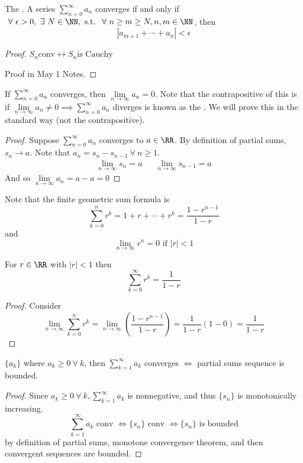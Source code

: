 \documentclass[12pt]{scrartcl}
\begin{document}
\begin{theorem}
  The . A series $\sum_{n=0}^\infty a_n$ converges 
  if and only if $\ \forall \ \epsilon > 0, \ \exists \ N \in \NN, \text{ s.t. } \ \forall \ n \geq m \geq N, n,m \in \NN$, then 
  \[|a_{m+1} + \cdots + a_n| < \epsilon\]
  \begin{proof}
    $S_n \text{conv} \leftrightarrow S_n \text{is Cauchy}$

    Proof in May 1 Notes.
  \end{proof}
\end{theorem}

\begin{theorem}
  If $\sum_{n = 0}^\infty a_n$ converges, then $\underset{n\to\infty}{\lim}a_n = 0$. Note that the contrapositive of this is 
  if $\underset{n\to\infty}{\lim}a_n \neq 0 \implies \sum_{n=0}^\infty a_n$ diverges is known as the .
  We will prove this in the standard way (not the contrapositive).

  \begin{proof}
    Suppose $\sum_{n=0}^\infty a_n$ converges to $a \in \RR$. By definition of partial sums, $s_n \to a$.
    Note that $a_n = s_n - s_{n-1} \ \forall \ n \geq 1$.
    \begin{align*}
      \lim_{n\to\infty} s_n = a && \lim_{n\to\infty} s_{n-1} = a
    \end{align*}
    And so $\underset{n\to\infty}{\lim}a_n = a - a = 0$
  \end{proof}
\end{theorem}

\begin{note}
  Note that the finite geometric sum formula is 
  \[\sum_{k=0}^n r^k = 1 + r + \cdots + r^k = \frac{1-r^{n-1}}{1 - r}\]
  and 
  \[\lim_{n\to\infty} r^n = 0 \text{ if } |r| < 1\]
\end{note}


\begin{proposition}
  For $r \in \RR$ with $|r| < 1$ then 
  \[\sum_{k=0}^\infty r^k = \frac{1}{1-r}\]
  \begin{proof}
    Consider 
    \[\underset{n\to\infty}{\lim}\sum_{k=0}^n r^k = \underset{n\to\infty}{\lim}(\frac{1-r^{n-1}}{1-r}) = \frac{1}{1-r}(1-0) = \frac{1}{1-r}\]
  \end{proof}
\end{proposition}

\begin{theorem}
  $\{a_k\}$ where $a_k \geq 0 \ \forall \ k$, then $\sum_{k=1}^\infty a_k$ converges $\Longleftrightarrow$ partial sums sequence is bounded.
  \begin{proof}
    Since $a_k \geq 0 \ \forall \ k, \sum_{k=1}^\infty a_k$ is nonnegative, and thus $\{s_n\}$ is monotonically increasing. 
    \[\sum_{k=1}^\infty a_k \text{ conv } \Longleftrightarrow \{s_n\} \text{ conv } \Longleftrightarrow \{s_n\} \text{ is bounded}\]
    by definition of partial sums, monotone convergence theorem, and then convergent sequences are bounded.
  \end{proof}
\end{theorem}
\end{document}
